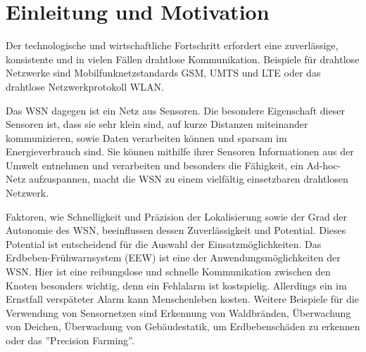 \documentclass[12pt, a4wide]{scrreprt}
\begin{document}
\newpage



\tableofcontents
{}

\chapter{Einleitung und Motivation}
\clearscrheadfoot
\pagestyle{scrheadings}
\rohead{\headmark}
\setheadsepline{.1pt}
\renewcommand*{\chapterpagestyle}{scrheadings}

Der technologische und wirtschaftliche Fortschritt erfordert eine zuverlässige, konsistente und in vielen Fällen drahtlose Kommunikation. Beispiele für drahtlose Netzwerke sind Mobilfunknetzstandards GSM, UMTS und LTE oder das drahtlose Netzwerkprotokoll WLAN.

Das \ac{WSN} dagegen ist ein Netz aus Sensoren. Die besondere Eigenschaft dieser Sensoren ist, dass sie sehr klein sind, auf kurze Distanzen miteinander kommunizieren, sowie Daten verarbeiten können und sparsam im Energieverbrauch sind. Sie können mithilfe ihrer Sensoren Informationen aus der Umwelt entnehmen und verarbeiten und besonders die Fähigkeit, ein Ad-hoc-Netz aufzuspannen, macht die \acs{WSN} zu einem vielfältig einsetzbaren drahtlosen Netzwerk.

Faktoren, wie Schnelligkeit und Präzision der Lokalisierung sowie der Grad der Autonomie des WSN, beeinflussen dessen Zuverlässigkeit und Potential. Dieses Potential ist entscheidend für die Auswahl der Einsatzmöglichkeiten. Das Erdbeben-Frühwarnsystem (EEW) ist eine der Anwendungsmöglichkeiten der \ac{WSN}. Hier ist eine reibungslose und schnelle Kommunikation zwischen den Knoten besonders wichtig, denn ein Fehlalarm ist kostspielig. Allerdings ein im Ernstfall verspäteter Alarm kann Menschenleben kosten. Weitere Beispiele für die Verwendung von Sensornetzen sind Erkennung von Waldbränden, Überwachung von Deichen, Überwachung von Gebäudestatik, um Erdbebenschäden zu erkennen\cite{building_monitoring} oder das ''Precision Farming''.
\end{document}
